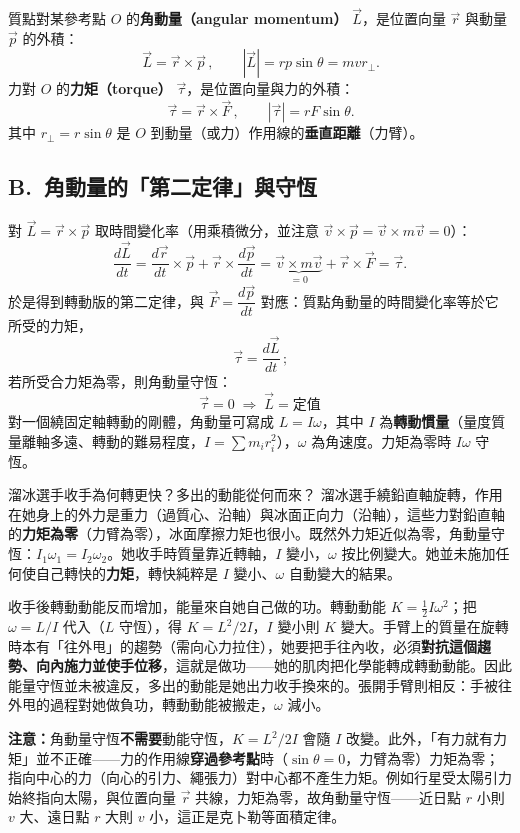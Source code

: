 \documentclass[11pt]{article}
\begin{document}
質點對某參考點 $O$ 的\textbf{角動量（angular momentum）} $\vec L$，是位置向量 $\vec r$ 與動量 $\vec p$ 的外積：
$$\boxed{\,\vec L=\vec r\times\vec p\,},\qquad |\vec L|=rp\sin\theta=mvr_\perp.$$
力對 $O$ 的\textbf{力矩（torque）} $\vec\tau$，是位置向量與力的外積：
$$\boxed{\,\vec\tau=\vec r\times\vec F\,},\qquad |\vec\tau|=rF\sin\theta.$$
其中 $r_\perp=r\sin\theta$ 是 $O$ 到動量（或力）作用線的\textbf{垂直距離}（力臂）。


\subsection*{\sffamily B.\ 角動量的「第二定律」與守恆}

對 $\vec L=\vec r\times\vec p$ 取時間變化率（用乘積微分，並注意 $\vec v\times\vec p=\vec v\times m\vec v=0$）：
$$\frac{d\vec L}{dt}=\frac{d\vec r}{dt}\times\vec p+\vec r\times\frac{d\vec p}{dt}=\underbrace{\vec v\times m\vec v}_{=0}+\vec r\times\vec F=\vec\tau.$$
於是得到轉動版的第二定律，與 $\vec F=\dfrac{d\vec p}{dt}$ 對應：質點角動量的時間變化率等於它所受的力矩，
$$\boxed{\,\vec\tau=\frac{d\vec L}{dt}\,};$$
若所受合力矩為零，則角動量守恆：
$$\boxed{\,\vec\tau=0\;\Longrightarrow\;\vec L=\text{定值}\,}$$
對一個繞固定軸轉動的剛體，角動量可寫成 $L=I\omega$，其中 $I$ 為\textbf{轉動慣量}（量度質量離軸多遠、轉動的難易程度，$I=\sum m_i r_i^2$），$\omega$ 為角速度。力矩為零時 $I\omega$ 守恆。

\begin{補充框}{溜冰選手收手為何轉更快？多出的動能從何而來？}
溜冰選手繞鉛直軸旋轉，作用在她身上的外力是重力（過質心、沿軸）與冰面正向力（沿軸），這些力對鉛直軸的\textbf{力矩為零}（力臂為零），冰面摩擦力矩也很小。既然外力矩近似為零，角動量守恆：$I_1\omega_1=I_2\omega_2$。她收手時質量靠近轉軸，$I$ 變小，$\omega$ 按比例變大。她並未施加任何使自己轉快的\textbf{力矩}，轉快純粹是 $I$ 變小、$\omega$ 自動變大的結果。

收手後轉動動能反而增加，能量來自她自己做的功。轉動動能 $K=\tfrac12 I\omega^2$；把 $\omega=L/I$ 代入（$L$ 守恆），得 $K=L^2/2I$，$I$ 變小則 $K$ 變大。手臂上的質量在旋轉時本有「往外甩」的趨勢（需向心力拉住），她要把手往內收，必須\textbf{對抗這個趨勢、向內施力並使手位移}，這就是做功——她的肌肉把化學能轉成轉動動能。因此能量守恆並未被違反，多出的動能是她出力收手換來的。張開手臂則相反：手被往外甩的過程對她做負功，轉動動能被搬走，$\omega$ 減小。

\textbf{注意：}角動量守恆\textbf{不需要}動能守恆，$K=L^2/2I$ 會隨 $I$ 改變。此外，「有力就有力矩」並不正確——力的作用線\textbf{穿過參考點}時（$\sin\theta=0$，力臂為零）力矩為零；指向中心的力（向心的引力、繩張力）對中心都不產生力矩。例如行星受太陽引力始終指向太陽，與位置向量 $\vec r$ 共線，力矩為零，故角動量守恆——近日點 $r$ 小則 $v$ 大、遠日點 $r$ 大則 $v$ 小，這正是克卜勒等面積定律。
\end{補充框}
\end{document}
